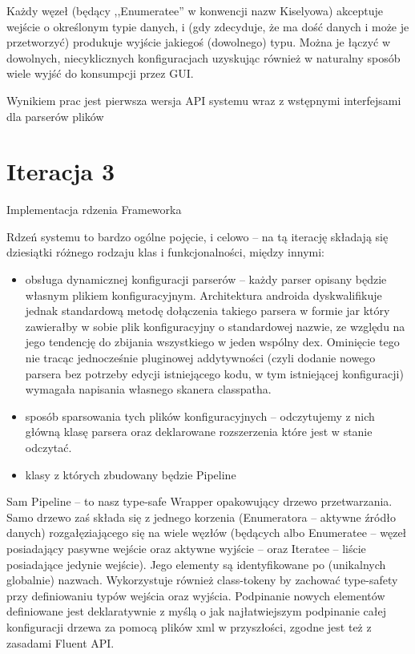 \begin{Note}
Każdy węzeł (będący ,,Enumeratee'' w konwencji nazw Kiselyowa) akceptuje wejście o określonym typie danych, i (gdy zdecyduje, że ma dość danych i może je przetworzyć) produkuje wyjście jakiegoś (dowolnego) typu. Można je łączyć w dowolnych, niecyklicznych konfiguracjach uzyskując również w naturalny sposób wiele wyjść do konsumpcji przez GUI.

Wynikiem prac jest pierwsza wersja API systemu wraz z wstępnymi interfejsami dla parserów plików

\end{Note}

\section{Iteracja 3}

\begin{Note}

	Implementacja rdzenia Frameworka


Rdzeń systemu to bardzo ogólne pojęcie, i celowo -- na tą iterację składają się dziesiątki różnego rodzaju klas i funkcjonalności, między innymi:

\begin{itemize}
    \item obsługa dynamicznej konfiguracji parserów --  każdy parser opisany będzie własnym plikiem konfiguracyjnym. Architektura androida dyskwalifikuje jednak standardową metodę dołączenia takiego parsera w formie jar który zawierałby w sobie plik konfiguracyjny o standardowej nazwie, ze względu na jego tendencję do zbijania wszystkiego w jeden wspólny dex. Ominięcie tego nie tracąc jednocześnie pluginowej addytywności (czyli dodanie nowego parsera bez potrzeby edycji istniejącego kodu, w tym istniejącej konfiguracji) wymagała napisania własnego skanera classpatha.
    \item sposób sparsowania tych plików konfiguracyjnych -- odczytujemy z nich główną klasę parsera oraz deklarowane rozszerzenia które jest w stanie odczytać.
    \item klasy z których zbudowany będzie Pipeline
\end{itemize}

Sam Pipeline -- to nasz type-safe Wrapper opakowujący drzewo przetwarzania. Samo drzewo zaś składa
się z jednego korzenia (Enumeratora -- aktywne źródło danych) rozgałęziającego się na wiele węzłów
(będących albo Enumeratee -- węzeł posiadający pasywne wejście oraz aktywne wyjście -- oraz Iteratee
-- liście posiadające jedynie wejście). Jego elementy są identyfikowane po (unikalnych globalnie) nazwach. Wykorzystuje również class-tokeny by zachować type-safety przy definiowaniu typów wejścia oraz wyjścia. Podpinanie nowych elementów definiowane jest deklaratywnie z myślą o jak najłatwiejszym podpinanie całej konfiguracji drzewa za pomocą plików xml w przyszłości, zgodne jest też z zasadami Fluent API.


\end{Note}
